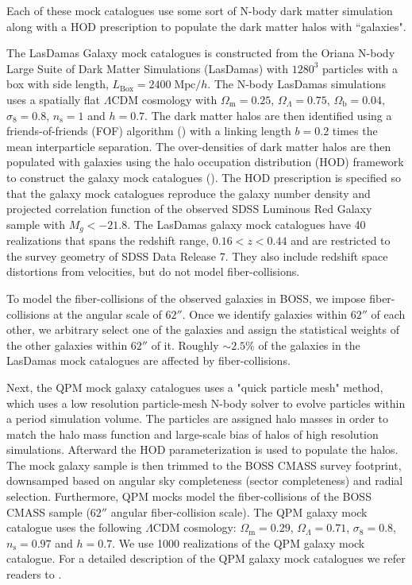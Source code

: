 \documentclass{emulateapj}
\begin{document}
Each of these mock catalogues use some sort of N-body dark matter simulation along with a HOD prescription to populate the dark matter halos with ``galaxies". %

The LasDamas Galaxy mock catalogues is constructed from the Oriana N-body Large Suite of Dark Matter Simulations (LasDamas) with $1280^3$ particles with a box with side length, $L_\mathrm{Box} = 2400\;\mathrm{Mpc}/h$. The N-body LasDamas simulations uses a spatially flat $\Lambda$CDM cosmology with $\Omega_\mathrm{m} = 0.25$, $\Omega_\Lambda = 0.75$, $\Omega_\mathrm{b} = 0.04$, $\sigma_8 = 0.8$, $n_\mathrm{s} = 1$ and $h=0.7$. The dark matter halos are then identified using a friends-of-friends (FOF) algorithm (\citealt{Davis:1985aa}) with a linking length $b = 0.2 $ times the mean interparticle separation. The over-densities of dark matter halos are then populated with galaxies using the halo occupation distribution (HOD) framework to construct the galaxy mock catalogues (\citealt{McBride:2009aa, McBride:2011aa}). The HOD prescription is specified so that the galaxy mock catalogues reproduce the galaxy number density and projected correlation function of the observed SDSS Luminous Red Galaxy sample with $M_g < -21.8$. The LasDamas galaxy mock catalogues have 40 realizations that spans the redshift range, $0.16 < z < 0.44$ and are restricted to the survey geometry of SDSS Data Release 7. They also include redshift space distortions from velocities, but do not model fiber-collisions. 

To model the fiber-collisions of the observed galaxies in BOSS, we impose fiber-collisions at the angular scale of $62''$. Once we identify galaxies within $62''$ of each other, we arbitrary select one of the galaxies and assign the statistical weights of the other galaxies within $62''$ of it. Roughly $\sim 2.5 \%$ of the galaxies in the LasDamas mock catalogues are affected by fiber-collisions. 

Next, the QPM mock galaxy catalogues uses a "quick particle mesh" method, which uses a low resolution particle-mesh N-body solver to evolve particles within a period simulation volume. The particles are assigned halo masses  in order to match the halo mass function and large-scale bias of halos of high resolution simulations. Afterward the \cite{Tinker:2012aa} HOD parameterization is used to populate the halos. The mock galaxy sample is then trimmed to the BOSS CMASS survey footprint, downsamped based on angular sky completeness (sector completeness) and radial selection. Furthermore, QPM mocks model the fiber-collisions of the BOSS CMASS sample ($62''$ angular fiber-collision scale). The QPM galaxy mock catalogue uses the following $\Lambda$CDM cosmology: $\Omega_\mathrm{m} = 0.29$, $\Omega_\Lambda = 0.71$, $\sigma_8 = 0.8$, $n_\mathrm{s} = 0.97$ and $h=0.7$. We use 1000 realizations of the QPM galaxy mock catalogue. For a detailed description of the QPM galaxy mock catalogues we refer readers to \cite{White:2014aa}. 
\end{document}
